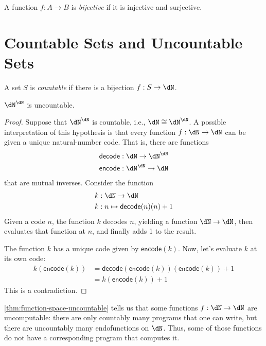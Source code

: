 \documentclass{amsart}
\begin{document}
\begin{defn}
  A function $f : A \to B$ is \emph{bijective} if it is injective and surjective.
\end{defn}



\section{Countable Sets and Uncountable Sets}
\label{sec:countable-sets-and-uncountable-sets}

\begin{defn}
  A set $S$ is \emph{countable} if there is a bijection $f : S \to \dN$.
\end{defn}

\begin{thm}\label{thm:function-space-uncountable}
  $\dN^{\dN}$ is uncountable.
\end{thm}
\begin{proof}
  Suppose that $\dN^{\dN}$ is countable, i.e., $\dN \iso \dN^{\dN}$.
  A possible interpretation of this hypothesis is that every function $f : \dN \to \dN$ can be given a unique natural-number code.
  That is, there are functions
  \begin{align}
    \mathsf{decode} &: \dN \to \dN^{\dN}\\
    \mathsf{encode} &: \dN^{\dN} \to \dN
  \end{align}
  that are mutual inverses.
  Consider the function
  \begin{align}
    k &: \dN \to \dN\\
    k &: n \mapsto \mathsf{decode}(n)(n) + 1
  \end{align}
  Given a code $n$, the function $k$ decodes $n$, yielding a function $\dN \to \dN$, then evaluates that function at $n$, and finally adds 1 to the result.

  The function $k$ has a unique code given by $\mathsf{encode}(k)$.
  Now, let's evaluate $k$ at its own code:
  \begin{align}
    k(\mathsf{encode}(k)) &= \mathsf{decode}(\mathsf{encode}(k))(\mathsf{encode}(k)) + 1\\
                          &= k(\mathsf{encode}(k)) + 1
  \end{align}
  This is a contradiction.
\end{proof}

\cref{thm:function-space-uncountable} tells us that some functions $f : \dN \to \dN$ are uncomputable: there are only countably many programs that one can write, but there are uncountably many endofunctions on $\dN$. Thus, some of those functions do not have a corresponding program that computes it.
\end{document}
